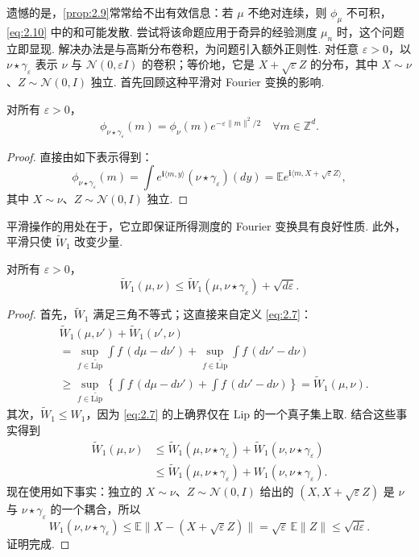 遗憾的是，\autoref{prop:2.9}常常给不出有效信息：若 $\mu$ 不绝对连续，则 $\phi_\mu$ 不可积，\eqref{eq:2.10} 中的和可能发散. 尝试将该命题应用于奇异的经验测度 $\mu_n$ 时，这个问题立即显现. 解决办法是与高斯分布卷积，为问题引入额外正则性. 对任意 $\varepsilon>0$，以 $\nu\star\gamma_\varepsilon$ 表示 $\nu$ 与 $\mathcal N(0,\varepsilon I)$ 的卷积；等价地，它是 $X+\sqrt\varepsilon Z$ 的分布，其中 $X\sim\nu$、$Z\sim\mathcal N(0,I)$ 独立. 首先回顾这种平滑对 Fourier 变换的影响.
\begin{lemma}\label{lem:2.10}
对所有 $\varepsilon>0$，
$$\phi_{\nu\star\gamma_\varepsilon}(m)=\phi_\nu(m)e^{-\varepsilon\lVert m\rVert^2/2}\quad\forall m\in\mathbb Z^d.$$
\end{lemma}
\begin{proof}
直接由如下表示得到：
$$\phi_{\nu\star\gamma_\varepsilon}(m)
=\int e^{\mathbf i\langle m,y\rangle}(\nu\star\gamma_\varepsilon)(dy)
=\mathbb Ee^{\mathbf i\langle m,X+\sqrt\varepsilon Z\rangle},$$
其中 $X\sim\nu$、$Z\sim\mathcal N(0,I)$ 独立.
\end{proof}
平滑操作的用处在于，它立即保证所得测度的 Fourier 变换具有良好性质. 此外，平滑只使 $\widetilde W_1$ 改变少量.
\begin{lemma}\label{lem:2.11}
对所有 $\varepsilon>0$，
$$\widetilde W_1(\mu,\nu)\le\widetilde W_1(\mu,\nu\star\gamma_\varepsilon)+\sqrt{d\varepsilon}.$$
\end{lemma}
\begin{proof}
首先，$\widetilde W_1$ 满足三角不等式；这直接来自定义 \eqref{eq:2.7}：
$$\begin{aligned}
&\widetilde W_1(\mu,\nu')+\widetilde W_1(\nu',\nu)\\
&=\sup_{f\in\widetilde{\mathrm{Lip}}}\int f\,(d\mu-d\nu')
+\sup_{f\in\widetilde{\mathrm{Lip}}}\int f\,(d\nu'-d\nu)\\
&\ge\sup_{f\in\widetilde{\mathrm{Lip}}}\left\{\int f\,(d\mu-d\nu')+\int f\,(d\nu'-d\nu)\right\}
=\widetilde W_1(\mu,\nu).
\end{aligned}$$
其次，$\widetilde W_1\le W_1$，因为 \eqref{eq:2.7} 的上确界仅在 $\mathrm{Lip}$ 的一个真子集上取. 结合这些事实得到
$$\begin{aligned}
\widetilde W_1(\mu,\nu)&\le\widetilde W_1(\mu,\nu\star\gamma_\varepsilon)+\widetilde W_1(\nu,\nu\star\gamma_\varepsilon)\\
&\le\widetilde W_1(\mu,\nu\star\gamma_\varepsilon)+W_1(\nu,\nu\star\gamma_\varepsilon).
\end{aligned}$$
现在使用如下事实：独立的 $X\sim\nu$、$Z\sim\mathcal N(0,I)$ 给出的 $(X,X+\sqrt\varepsilon Z)$ 是 $\nu$ 与 $\nu\star\gamma_\varepsilon$ 的一个耦合，所以
$$W_1(\nu,\nu\star\gamma_\varepsilon)\le\mathbb E\lVert X-(X+\sqrt\varepsilon Z)\rVert
=\sqrt\varepsilon\,\mathbb E\lVert Z\rVert\le\sqrt{d\varepsilon}.$$
证明完成.
\end{proof}
